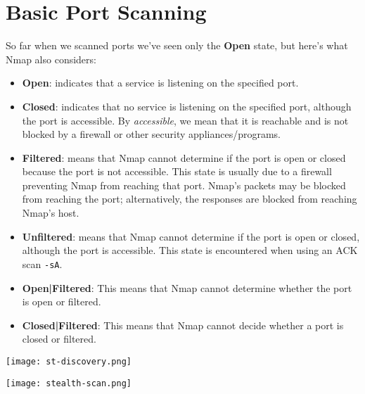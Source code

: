 \documentclass[11pt]{article}
\begin{document}
\setcounter{section}{3}
\setcounter{page}{13}  %

\renewcommand{\thesubsubsection}{\thesubsection.\Roman{subsubsection}}

\section{Basic Port Scanning}

\begin{tcolorbox}[colback=codebackground, colframe=warningcolor]
So far when we scanned ports we've seen only the \textbf{Open} state, but here's what Nmap also considers:

\begin{itemize}[leftmargin=*]
    \item \textbf{Open}: indicates that a service is listening on the specified port.
    \item \textbf{Closed}: indicates that no service is listening on the specified port, although the port is accessible. By \textit{accessible}, we mean that it is reachable and is not blocked by a firewall or other security appliances/programs.
    \item \textbf{Filtered}: means that Nmap cannot determine if the port is open or closed because the port is not accessible. This state is usually due to a firewall preventing Nmap from reaching that port. Nmap's packets may be blocked from reaching the port; alternatively, the responses are blocked from reaching Nmap's host.
    \item \textbf{Unfiltered}: means that Nmap cannot determine if the port is open or closed, although the port is accessible. This state is encountered when using an ACK scan \texttt{-sA}.
    \item \textbf{Open|Filtered}: This means that Nmap cannot determine whether the port is open or filtered.
    \item \textbf{Closed|Filtered}: This means that Nmap cannot decide whether a port is closed or filtered.
\end{itemize}
\end{tcolorbox}
\begin{center}
    \texttt{[image: st-discovery.png]}
    \label{fig:sT-scan}
    \end{center}
    \begin{center}
        \texttt{[image: stealth-scan.png]}
        \label{fig:sS-scan}
        \end{center}
\end{document}
